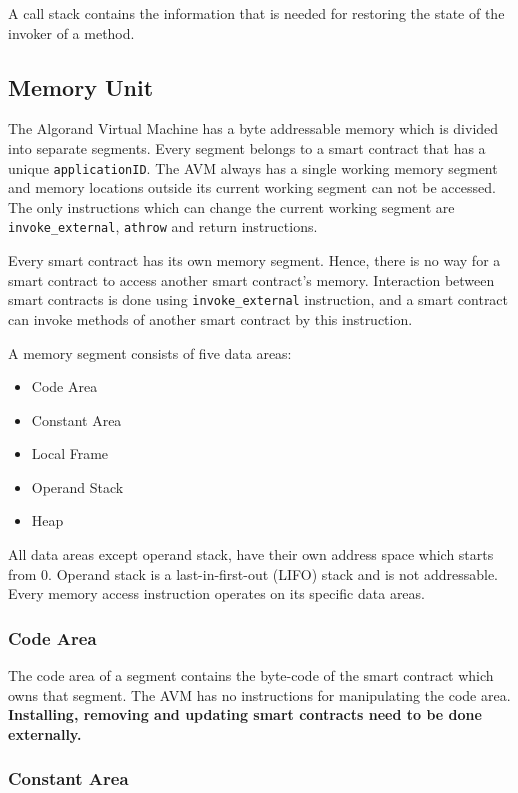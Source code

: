 \documentclass[11pt, A4]{report}
\begin{document}
    A call stack contains the information that is needed for restoring the state of the invoker of a method.

    \subsection{Memory Unit}\label{subsec:memory-unit}

    The Algorand Virtual Machine has a byte addressable memory which is divided into separate segments. Every segment
    belongs to a smart contract that has a unique \texttt{applicationID}. The AVM always has a single working memory
    segment and memory locations outside its current working segment can not be accessed. The only instructions which
    can change the current working segment are \texttt{invoke\_external}, \texttt{athrow} and return instructions.

    Every smart contract has its own memory segment. Hence, there is no way for a smart contract to access another
    smart contract's memory. Interaction between smart contracts is done using \texttt{invoke\_external} instruction,
    and a smart contract can invoke methods of another smart contract by this instruction.

    A memory segment consists of five data areas:
    \begin{itemize}
        \item Code Area
        \item Constant Area
        \item Local Frame
        \item Operand Stack
        \item Heap
    \end{itemize}
    All data areas except operand stack, have their own address space which starts from 0. Operand stack is a
    last-in-first-out (LIFO) stack and is not addressable. Every memory access instruction operates on its specific
    data areas.

    \subsubsection{Code Area}

    The code area of a segment contains the byte-code of the smart contract which owns that segment. The AVM has no
    instructions for manipulating the code area. \textbf{Installing, removing and updating smart contracts need to
    be done externally.}

    \subsubsection{Constant Area}
\end{document}
